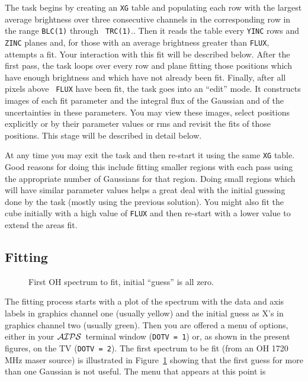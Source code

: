 \documentclass[twoside]{article}
\newcommand{\Me}[1]{\textcolor{mecol}{#1}}
\newcommand{\AIPS}{{$\cal AIPS\/$}}
\newcommand{\putfig}[1]{\texttt{[image: \#1.eps]}}
\begin{document}
The task begins by creating an {\tt XG} table and populating each row
with the largest average brightness over three consecutive channels in
the corresponding row \Me{in the range {\tt BLC(1)} through {\tt
TRC(1)}\@.}.  Then it reads the table every {\tt YINC} rows and {\tt
ZINC} planes and, for those with an average brightness greater than
{\tt FLUX}, attempts a fit.  Your interaction with this fit will be
described below.  After the first pass, the task loops over every row
and plane fitting those positions which have enough brightness and
which have not already been fit.  Finally, after all pixels above {\tt
  FLUX} have been fit, the task goes into an ``edit'' mode.  It
constructs images of each fit parameter and the integral flux of the
Gaussian and of the uncertainties in these parameters.  You may view
these images, select positions explicitly or by their parameter values
or rms and revisit the fits of those positions.  This stage will be
described in detail below.

At any time you may exit the task and then re-start it using the
same {\tt XG} table.  Good reasons for doing this include fitting
smaller regions with each pass using the appropriate number of
Gaussians for that region.  Doing small regions which will have
similar parameter values helps a great deal with the initial guessing
done by the task (mostly using the previous solution).  You might also
fit the cube initially with a high value of {\tt FLUX} and then
re-start with a lower value to extend the areas fit.

\subsection{Fitting}

\begin{figure}
\begin{center}
\resizebox{6.0in}{!}{\putfig{XGAUS.init}}
\caption{First OH spectrum to fit, initial ``guess'' is all zero.}
\label{fig:XGAUS.init}
\end{center}
\end{figure}

The fitting process starts with a plot of the spectrum with the data
and axis labels in graphics channel one (usually yellow) and the
initial guess as X's in graphics channel two (usually green).  Then
you are offered a menu of options, either in your \AIPS\ terminal
window ({\tt DOTV = 1}) or, as shown in the present figures, on the TV
({\tt DOTV = 2}).  The first spectrum to be fit (from an OH 1720 MHz
maser source) is illustrated in Figure~\ref{fig:XGAUS.init} showing
that the first guess for more than one Gaussian is not useful.  The
menu that appears at this point is\\
\end{document}

